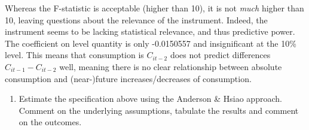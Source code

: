 \documentclass[
]{article}
\providecommand{\tightlist}{%
  \setlength{\itemsep}{0pt}\setlength{\parskip}{0pt}}
\begin{document}
Whereas the F-statistic is acceptable (higher than 10), it is not
\emph{much} higher than 10, leaving questions about the relevance of the
instrument. Indeed, the instrument seems to be lacking statistical
relevance, and thus predictive power. The coefficient on level quantity
is only -0.0150557 and insignificant at the 10\% level. This means that
consumption is \(C_{it-2}\) does not predict differences
\(C_{it-1} - C_{it-2}\) well, meaning there is no clear relationship
between absolute consumption and (near-)future increases/decreases of
consumption.

\begin{enumerate}
\def\labelenumi{\arabic{enumi}.}
\setcounter{enumi}{2}
\tightlist
\item
  Estimate the specification above using the Anderson \& Hsiao approach.
  Comment on the underlying assumptions, tabulate the results and
  comment on the outcomes.
\end{enumerate}
\end{document}
